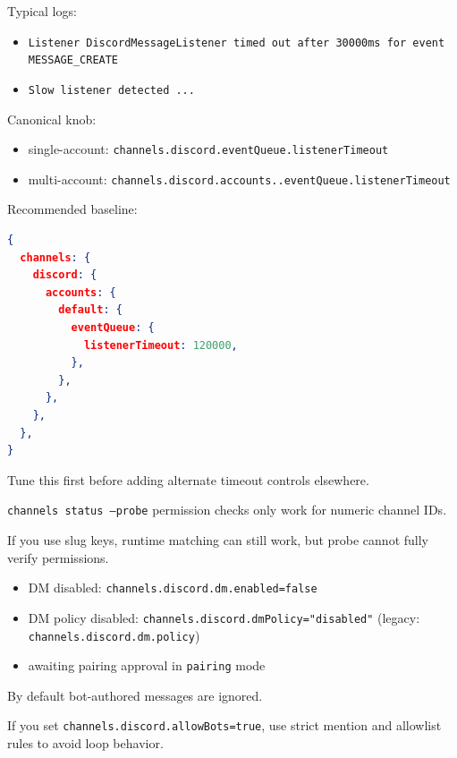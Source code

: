 Typical logs:

\begin{itemize}
  \item \texttt{Listener DiscordMessageListener timed out after 30000ms for event MESSAGE\_CREATE}
  \item \texttt{Slow listener detected ...}
\end{itemize}


Canonical knob:

\begin{itemize}
  \item single-account: \texttt{channels.discord.eventQueue.listenerTimeout}
  \item multi-account: \texttt{channels.discord.accounts..eventQueue.listenerTimeout}
\end{itemize}


Recommended baseline:

\begin{lstlisting}[language=json]
{
  channels: {
    discord: {
      accounts: {
        default: {
          eventQueue: {
            listenerTimeout: 120000,
          },
        },
      },
    },
  },
}
\end{lstlisting}


Tune this first before adding alternate timeout controls elsewhere.


\texttt{channels status --probe} permission checks only work for numeric channel IDs.

If you use slug keys, runtime matching can still work, but probe cannot fully verify permissions.



\begin{itemize}
  \item DM disabled: \texttt{channels.discord.dm.enabled=false}
  \item DM policy disabled: \texttt{channels.discord.dmPolicy="disabled"} (legacy: \texttt{channels.discord.dm.policy})
  \item awaiting pairing approval in \texttt{pairing} mode
\end{itemize}



By default bot-authored messages are ignored.

If you set \texttt{channels.discord.allowBots=true}, use strict mention and allowlist rules to avoid loop behavior.



